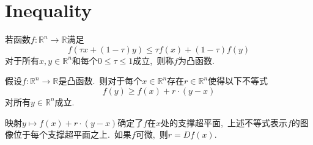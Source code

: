 	\chapter{Inequality}
\begin{definition}[凸函数]
	若函数$f:\mathbb{R}^ n\to\mathbb{R}$满足
	$$f(\tau x+(1-\tau)y)\leqslant \tau f(x)+(1-\tau)f(y)$$
	对于所有$x,y\in\mathbb{R}^n$和每个$0\leqslant\tau\leqslant 1$成立,\ 则称$f$为凸函数.
\end{definition}
\begin{theorem}[支撑超平面]
	假设$f:\mathbb{R}^n\to\mathbb{R}$是凸函数.\ 则对于每个$x\in\mathbb{R}^n$存在$r\in\mathbb{R}^n$使得以下不等式
	$$f(y)\geqslant f(x)+r\cdot(y-x)$$
	对所有$y\in\mathbb{R}^n$成立.
\end{theorem}
映射$y\mapsto f(x)+r\cdot(y-x)$确定了$f$在$x$处的支撑超平面,\ 上述不等式表示$f$的图像位于每个支撑超平面之上.\ 如果$f$可微,\ 则$r=Df(x).$

